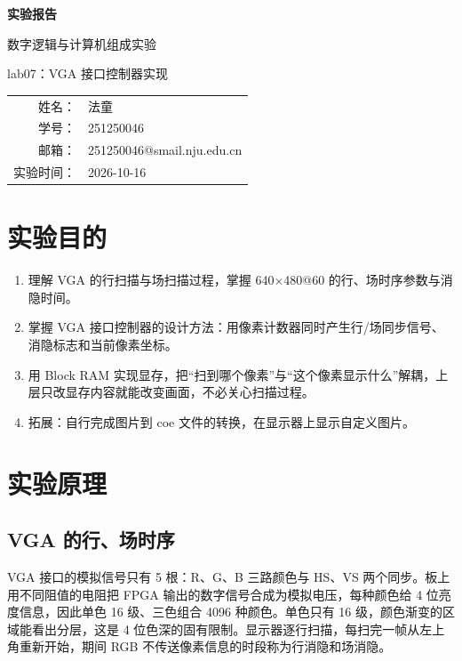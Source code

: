 \documentclass[12pt, a4paper]{ctexart}
\makeatletter
\newcommand{\coursename}{数字逻辑与计算机组成实验}
\newcommand{\expname}{lab07：VGA 接口控制器实现}
\newcommand{\expdate}{2026-10-16}
\newcommand{\stuname}{法童}
\newcommand{\stuid}{251250046}
\newcommand{\stumail}{251250046@smail.nju.edu.cn}
\makeatother
\begin{document}
\begin{titlepage}
    \centering
    \vspace*{4cm}
    {\Huge\bfseries 实验报告\par}
    \vspace{1.5cm}
    {\Large \coursename\par}
    \vspace{0.8cm}
    {\Large \expname\par}
    \vspace{3cm}
    {\large
    \begin{tabular}{rl}
        姓名： & \stuname \\
        学号： & \stuid \\
        邮箱： & \stumail \\
        实验时间： & \expdate \\
    \end{tabular}\par}
\end{titlepage}

\section{实验目的}
\begin{enumerate}
    \item 理解 VGA 的行扫描与场扫描过程，掌握 640$\times$480@60 的行、场时序参数与消隐时间。
    \item 掌握 VGA 接口控制器的设计方法：用像素计数器同时产生行/场同步信号、消隐标志和当前像素坐标。
    \item 用 Block RAM 实现显存，把“扫到哪个像素”与“这个像素显示什么”解耦，上层只改显存内容就能改变画面，不必关心扫描过程。
    \item 拓展：自行完成图片到 coe 文件的转换，在显示器上显示自定义图片。
\end{enumerate}

\section{实验原理}

\subsection{VGA 的行、场时序}
VGA 接口的模拟信号只有 5 根：R、G、B 三路颜色与 HS、VS 两个同步。板上用不同阻值的电阻把 FPGA 输出的数字信号合成为模拟电压，每种颜色给 4 位亮度信息，因此单色 16 级、三色组合 4096 种颜色。单色只有 16 级，颜色渐变的区域能看出分层，这是 4 位色深的固有限制。显示器逐行扫描，每扫完一帧从左上角重新开始，期间 RGB 不传送像素信息的时段称为行消隐和场消隐。
\end{document}
